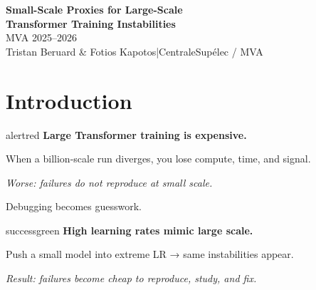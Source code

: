 \documentclass[12pt,a4paper]{article}
\begin{document}
\begin{tcolorbox}[
  enhanced, colback=deepblue, colframe=deepblue,
  arc=6pt, boxrule=0pt,
  left=12pt, right=12pt, top=10pt, bottom=10pt
]
  {\color{white}\Large\bfseries Small-Scale Proxies for Large-Scale\\[2pt]
   Transformer Training Instabilities}\\[6pt]
  {\color{lightblue}MVA 2025–2026}\\[4pt]
  {\color{white!70!deepblue}\small
   Tristan Beruard \& Fotios Kapotos\quad|\quad CentraleSupélec / MVA}
\end{tcolorbox}


\section*{Introduction}
\noindent
\begin{minipage}[t]{0.48\linewidth}
\begin{claimbox}{alertred}
\small
\textbf{Large Transformer training is expensive.}

When a billion-scale run diverges, you lose compute, time, and signal.

\medskip
\textit{Worse: failures do not reproduce at small scale.}

Debugging becomes guesswork.
\end{claimbox}
\end{minipage}
\hfill
\begin{minipage}[t]{0.48\linewidth}
\begin{claimbox}{successgreen}
\small
\textbf{High learning rates mimic large scale.}

Push a small model into extreme LR →
same instabilities appear.

\medskip
\textit{Result: failures become cheap to reproduce, study, and fix.}
\end{claimbox}
\end{minipage}

\vspace{6pt}
\end{document}
